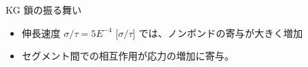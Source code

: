 \documentclass[11pt, dvipdfmx]{beamer}
\begin{document}
\begin{appendix}
\begin{frame}
\begin{block}{KG 鎖の振る舞い}
\begin{itemize}
\item
伸長速度 $\sigma/\tau = 5E^{-4}$ [$\sigma/\tau$] では、ノンボンドの寄与が大きく増加
\item
セグメント間での相互作用が応力の増加に寄与。
\end{itemize}
\end{block}

\end{frame}


\end{appendix}
\end{document}

